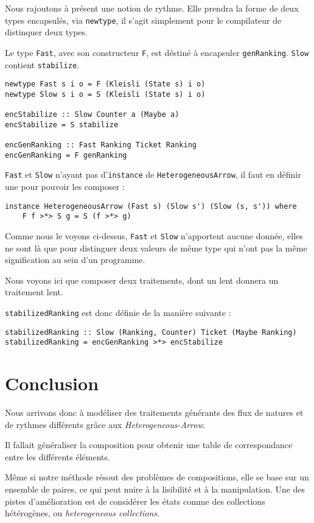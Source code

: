 \documentclass{llncs}
\newcommand{\SAp}{\emph{Heterogeneous-Arrow}. }
\newcommand{\HAv}{\lstinline{HeterogeneousArrow}, }
\begin{document}
Nous rajoutons à présent une notion de rythme.
Elle prendra la forme de deux types encapsulés, via \lstinline{newtype}, il s'agit
simplement pour le compilateur de distinquer deux types.

Le type \lstinline{Fast}, avec son constructeur \lstinline{F}, est déstiné à
encapsuler \lstinline{genRanking}.
\lstinline{Slow} contient \lstinline{stabilize}.
\begin{lstlisting}
newtype Fast s i o = F (Kleisli (State s) i o)
newtype Slow s i o = S (Kleisli (State s) i o)

encStabilize :: Slow Counter a (Maybe a)
encStabilize = S stabilize

encGenRanking :: Fast Ranking Ticket Ranking
encGenRanking = F genRanking
\end{lstlisting}

\lstinline{Fast} et \lstinline{Slow} n'ayant pas d'\lstinline{instance} de \HAv
il faut en définir une pour pouvoir les composer :
\begin{lstlisting}
instance HeterogeneousArrow (Fast s) (Slow s') (Slow (s, s')) where
    F f >*> S g = S (f >*> g)
\end{lstlisting}
Comme nous le voyons ci-dessus, \lstinline{Fast} et \lstinline{Slow} n'apportent
aucune donnée, elles ne sont là que pour distinguer deux valeurs de même type qui
n'ont pas la même signification au sein d'un programme.

Nous voyons ici que composer deux traitements, dont un lent donnera un traitement
lent.

\lstinline{stabilizedRanking} est donc définie de la manière suivante :
\begin{lstlisting}
stabilizedRanking :: Slow (Ranking, Counter) Ticket (Maybe Ranking)
stabilizedRanking = encGenRanking >*> encStabilize
\end{lstlisting}

\section{Conclusion}
Nous arrivons donc à modéliser des traitements générants des flux de natures et de
rythmes différents grâce aux \SAp

Il fallait généraliser la composition pour obtenir une table de correspondance entre
les différents éléments.

Même si notre méthode résout des problèmes de compositions, elle se base sur un
ensemble de paires, ce qui peut nuire à la lisibilité et à la manipulation.
Une des pistes d'amélioration est de considérer les états comme des collections
hétérogènes, ou \emph{heterogeneous collections}.
\end{document}
